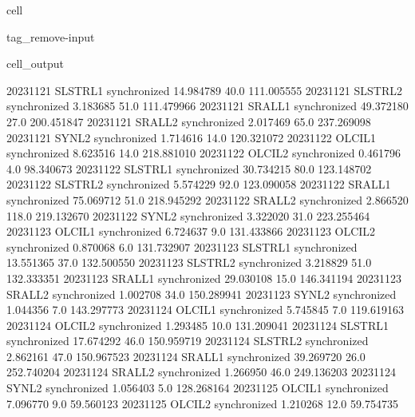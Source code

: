 \documentclass[letterpaper,10pt,english]{jupyterBook}
\begin{document}
\begin{sphinxuseclass}{cell}
\begin{sphinxuseclass}{tag_remove-input}
\begin{sphinxVerbatimOutput}
\begin{sphinxuseclass}{cell_output}
\begin{sphinxVerbatim}[commandchars=\\\{\}]
2023\PYGZhy{}11\PYGZhy{}21     SLSTR\PYGZus{}L1  synchronized   14.984789    40.0  111.005555
2023\PYGZhy{}11\PYGZhy{}21     SLSTR\PYGZus{}L2  synchronized    3.183685    51.0  111.479966
2023\PYGZhy{}11\PYGZhy{}21      SRAL\PYGZus{}L1  synchronized   49.372180    27.0  200.451847
2023\PYGZhy{}11\PYGZhy{}21      SRAL\PYGZus{}L2  synchronized    2.017469    65.0  237.269098
2023\PYGZhy{}11\PYGZhy{}21       SYN\PYGZus{}L2  synchronized    1.714616    14.0  120.321072
2023\PYGZhy{}11\PYGZhy{}22      OLCI\PYGZus{}L1  synchronized    8.623516    14.0  218.881010
2023\PYGZhy{}11\PYGZhy{}22      OLCI\PYGZus{}L2  synchronized    0.461796     4.0   98.340673
2023\PYGZhy{}11\PYGZhy{}22     SLSTR\PYGZus{}L1  synchronized   30.734215    80.0  123.148702
2023\PYGZhy{}11\PYGZhy{}22     SLSTR\PYGZus{}L2  synchronized    5.574229    92.0  123.090058
2023\PYGZhy{}11\PYGZhy{}22      SRAL\PYGZus{}L1  synchronized   75.069712    51.0  218.945292
2023\PYGZhy{}11\PYGZhy{}22      SRAL\PYGZus{}L2  synchronized    2.866520   118.0  219.132670
2023\PYGZhy{}11\PYGZhy{}22       SYN\PYGZus{}L2  synchronized    3.322020    31.0  223.255464
2023\PYGZhy{}11\PYGZhy{}23      OLCI\PYGZus{}L1  synchronized    6.724637     9.0  131.433866
2023\PYGZhy{}11\PYGZhy{}23      OLCI\PYGZus{}L2  synchronized    0.870068     6.0  131.732907
2023\PYGZhy{}11\PYGZhy{}23     SLSTR\PYGZus{}L1  synchronized   13.551365    37.0  132.500550
2023\PYGZhy{}11\PYGZhy{}23     SLSTR\PYGZus{}L2  synchronized    3.218829    51.0  132.333351
2023\PYGZhy{}11\PYGZhy{}23      SRAL\PYGZus{}L1  synchronized   29.030108    15.0  146.341194
2023\PYGZhy{}11\PYGZhy{}23      SRAL\PYGZus{}L2  synchronized    1.002708    34.0  150.289941
2023\PYGZhy{}11\PYGZhy{}23       SYN\PYGZus{}L2  synchronized    1.044356     7.0  143.297773
2023\PYGZhy{}11\PYGZhy{}24      OLCI\PYGZus{}L1  synchronized    5.745845     7.0  119.619163
2023\PYGZhy{}11\PYGZhy{}24      OLCI\PYGZus{}L2  synchronized    1.293485    10.0  131.209041
2023\PYGZhy{}11\PYGZhy{}24     SLSTR\PYGZus{}L1  synchronized   17.674292    46.0  150.959719
2023\PYGZhy{}11\PYGZhy{}24     SLSTR\PYGZus{}L2  synchronized    2.862161    47.0  150.967523
2023\PYGZhy{}11\PYGZhy{}24      SRAL\PYGZus{}L1  synchronized   39.269720    26.0  252.740204
2023\PYGZhy{}11\PYGZhy{}24      SRAL\PYGZus{}L2  synchronized    1.266950    46.0  249.136203
2023\PYGZhy{}11\PYGZhy{}24       SYN\PYGZus{}L2  synchronized    1.056403     5.0  128.268164
2023\PYGZhy{}11\PYGZhy{}25      OLCI\PYGZus{}L1  synchronized    7.096770     9.0   59.560123
2023\PYGZhy{}11\PYGZhy{}25      OLCI\PYGZus{}L2  synchronized    1.210268    12.0   59.754735

\end{sphinxVerbatim}
\end{sphinxuseclass}
\end{sphinxVerbatimOutput}
\end{sphinxuseclass}
\end{sphinxuseclass}
\end{document}
